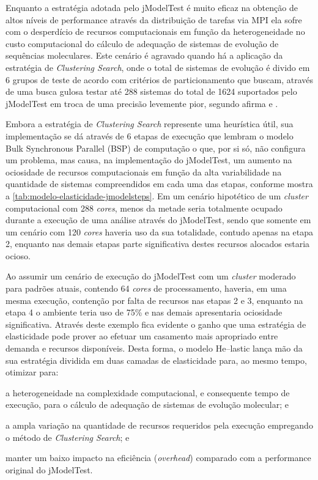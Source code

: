 \documentclass[english,brazilian]{UNISINOSmonografia} %
\begin{document}
Enquanto a estratégia adotada pelo jModelTest é muito eficaz na obtenção de altos níveis de performance através da distribuição de tarefas via MPI ela sofre com o desperdício de recursos computacionais em função da heterogeneidade no custo computacional do cálculo de adequação de sistemas de evolução de sequências moleculares.
Este cenário é agravado quando há a aplicação da estratégia de \textit{Clustering Search}, onde o total de sistemas de evolução é divido em 6 grupos de teste de acordo com critérios de particionamento que buscam, através de uma busca gulosa testar até 288 sistemas do total de 1624 suportados pelo jModelTest em troca de uma precisão levemente pior, segundo afirma  e .



Embora a estratégia de \textit{Clustering Search} represente uma heurística útil, sua implementação se dá através de 6 etapas de execução que lembram o modelo Bulk Synchronous Parallel (BSP) de computação o que, por si só, não configura um problema, mas causa, na implementação do jModelTest, um aumento na ociosidade de recursos computacionais em função da alta variabilidade na quantidade de sistemas compreendidos em cada uma das etapas, conforme mostra a \autoref{tab:modelo-elasticidade-jmodelsteps}.
Em um cenário hipotético de um \textit{cluster} computacional com 288 \textit{cores}, menos da metade seria totalmente ocupado durante a execução de uma análise através do jModelTest, sendo que somente em um cenário com 120 \textit{cores} haveria uso da sua totalidade, contudo apenas na etapa 2, enquanto nas demais etapas parte significativa destes recursos alocados estaria ocioso.



Ao assumir um cenário de execução do jModelTest com um \textit{cluster} moderado para padrões atuais, contendo 64 \textit{cores} de processamento, haveria, em uma mesma execução, contenção por falta de recursos nas etapas 2 e 3, enquanto na etapa 4 o ambiente teria uso de 75\% e nas demais apresentaria ociosidade significativa.
Através deste exemplo fica evidente o ganho que uma estratégia de elasticidade pode prover ao efetuar um casamento mais apropriado entre demanda e recursos disponíveis.
Desta forma, o modelo \textsf{He}--lastic lança mão da sua estratégia dividida em duas camadas de elasticidade para, ao mesmo tempo, otimizar para:
\begin{inparaenum} 
	\item a heterogeneidade na complexidade computacional, e consequente tempo de execução, para o cálculo de adequação de sistemas de evolução molecular; e
	\item a ampla variação na quantidade de recursos requeridos pela execução empregando o método de \textit{Clustering Search}; e
	\item manter um baixo impacto na eficiência (\textit{overhead}) comparado com a performance original do jModelTest. 
\end{inparaenum}
\end{document}
